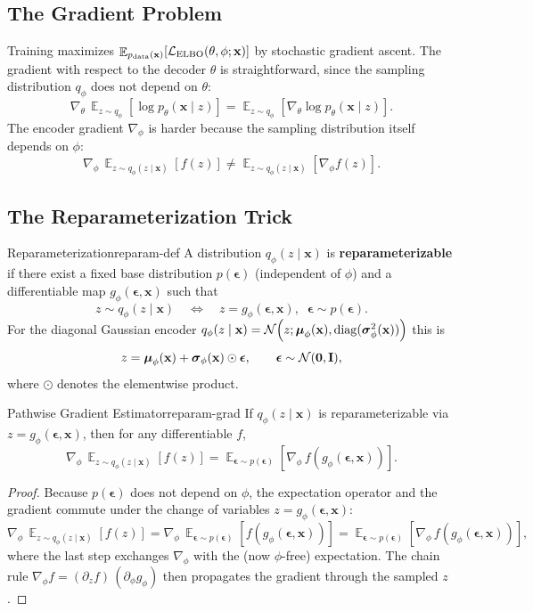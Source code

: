 \documentclass[11pt,a4paper]{article}
\DeclareMathOperator*{\E}{\mathbb{E}}
\DeclareMathOperator{\diag}{diag}
\newcommand{\bx}{\mathbf{x}} \newcommand{\by}{\mathbf{y}}
\newcommand{\bzero}{\mathbf{0}} \newcommand{\bI}{\mathbf{I}}
\newcommand{\bmu}{\boldsymbol{\mu}}
\newcommand{\bsigma}{\boldsymbol{\sigma}}
\newcommand{\beps}{\boldsymbol{\epsilon}}
\newcommand{\elbo}{\cL_{\mathrm{ELBO}}}
\newcommand{\pdata}{p_{\mathrm{data}}}
\begin{document}
\subsection{The Gradient Problem}

Training maximizes $\E_{\pdata(\bx)}[\elbo(\theta,\phi;\bx)]$ by stochastic gradient ascent. The gradient with respect to the decoder $\theta$ is straightforward, since the sampling distribution $q_\phi$ does not depend on $\theta$:
\[
    \nabla_\theta\,\E_{z\sim q_\phi}\!\left[\log p_\theta(\bx\mid z)\right]
    = \E_{z\sim q_\phi}\!\left[\nabla_\theta\log p_\theta(\bx\mid z)\right].
\]
The encoder gradient $\nabla_\phi$ is harder because the sampling distribution itself depends on $\phi$:
\[
    \nabla_\phi\,\E_{z\sim q_\phi(z\mid \bx)}\!\left[f(z)\right]
    \neq \E_{z\sim q_\phi(z\mid \bx)}\!\left[\nabla_\phi f(z)\right].
\]

\subsection{The Reparameterization Trick}

\begin{definition}{Reparameterization}{reparam-def}
A distribution $q_\phi(z\mid \bx)$ is \textbf{reparameterizable} if there exist a fixed base distribution $p(\beps)$ (independent of $\phi$) and a differentiable map $g_\phi(\beps,\bx)$ such that
\[
    z\sim q_\phi(z\mid \bx)
    \quad\Longleftrightarrow\quad
    z = g_\phi(\beps,\bx),\;\; \beps\sim p(\beps).
\]
For the diagonal Gaussian encoder $q_\phi(z\mid \bx)=\cN\!\left(z;\bmu_\phi(\bx),\diag(\bsigma_\phi^2(\bx))\right)$ this is
\[
    z = \bmu_\phi(\bx) + \bsigma_\phi(\bx)\odot\beps,
    \qquad \beps\sim\cN(\bzero,\bI),
\]
where $\odot$ denotes the elementwise product.
\end{definition}

\begin{proposition}{Pathwise Gradient Estimator}{reparam-grad}
If $q_\phi(z\mid \bx)$ is reparameterizable via $z=g_\phi(\beps,\bx)$, then for any differentiable $f$,
\[
    \nabla_\phi\,\E_{z\sim q_\phi(z\mid \bx)}\!\left[f(z)\right]
    = \E_{\beps\sim p(\beps)}\!\left[\nabla_\phi\, f\!\left(g_\phi(\beps,\bx)\right)\right].
\]
\end{proposition}

\begin{proof}
Because $p(\beps)$ does not depend on $\phi$, the expectation operator and the gradient commute under the change of variables $z=g_\phi(\beps,\bx)$:
\[
    \nabla_\phi\,\E_{z\sim q_\phi(z\mid \bx)}\!\left[f(z)\right]
    = \nabla_\phi\,\E_{\beps\sim p(\beps)}\!\left[f\!\left(g_\phi(\beps,\bx)\right)\right]
    = \E_{\beps\sim p(\beps)}\!\left[\nabla_\phi\, f\!\left(g_\phi(\beps,\bx)\right)\right],
\]
where the last step exchanges $\nabla_\phi$ with the (now $\phi$-free) expectation. The chain rule $\nabla_\phi f = (\partial_z f)\,(\partial_\phi g_\phi)$ then propagates the gradient through the sampled $z$.
\end{proof}
\end{document}
